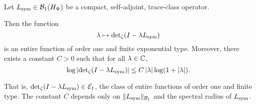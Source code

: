 \begin{lemma}
\label{lem:det_growth_bound}
Let \( L_{\mathrm{sym}} \in \mathcal{B}_1(H_{\Psi}) \) be a compact, self-adjoint, trace-class operator.

Then the function
\[
\lambda \mapsto \det\nolimits_{\zeta}(I - \lambda L_{\mathrm{sym}})
\]
is an entire function of order one and finite exponential type. Moreover, there exists a constant \( C > 0 \) such that for all \( \lambda \in \mathbb{C} \),
\[
\log \left| \det\nolimits_{\zeta}(I - \lambda L_{\mathrm{sym}}) \right|
\le C\, |\lambda| \log(1 + |\lambda|).
\]

\medskip
\noindent
That is, \( \det\nolimits_\zeta(I - \lambda L_{\mathrm{sym}}) \in \mathcal{E}_1 \), the class of entire functions of order one and finite type. The constant \( C \) depends only on \( \|L_{\mathrm{sym}}\|_{\mathcal{B}_1} \) and the spectral radius of \( L_{\mathrm{sym}} \).
\end{lemma}
